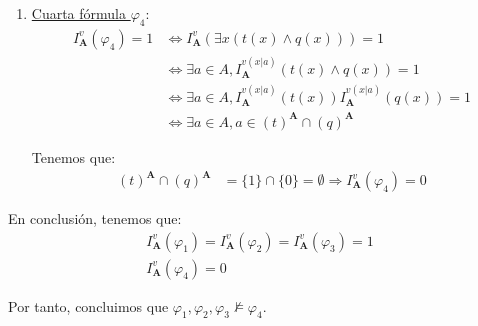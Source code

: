 \documentclass[12pt]{article}
\renewcommand{\bf}[1]{\mathbf{#1}}
\begin{document}
\begin{ejercicio}
\begin{enumerate}
        \item \ul{Cuarta fórmula $\varphi_4$}:
        \begin{align*}
            I_{\bf{A}}^v(\varphi_4) = 1 &\Longleftrightarrow
            I_{\bf{A}}^v(\exists x\left( t(x) \land q(x) \right)) = 1\\
            & \Longleftrightarrow \exists a\in A, I_{\bf{A}}^{v(x|a)}\left( t(x) \land q(x) \right) = 1\\
            & \Longleftrightarrow \exists a\in A, I_{\bf{A}}^{v(x|a)}\left( t(x) \right)I_{\bf{A}}^{v(x|a)}\left( q(x) \right) = 1\\
            & \Longleftrightarrow \exists a\in A, a\in (t)^{\bf{A}}\cap (q)^{\bf{A}}
        \end{align*}
    
        Tenemos que:
        \begin{align*}
            (t)^{\bf{A}}\cap (q)^{\bf{A}} &= \{1\}\cap \{0\} = \emptyset
            \Longrightarrow
            I_{\bf{A}}^v(\varphi_4) = 0
        \end{align*}
    \end{enumerate}
    
    En conclusión, tenemos que:   
    \begin{gather*}
        I_{\bf{A}}^v(\varphi_1) = I_{\bf{A}}^v(\varphi_2) = I_{\bf{A}}^v(\varphi_3) = 1\\
        I_{\bf{A}}^v(\varphi_4) = 0
    \end{gather*}

    Por tanto, concluimos que $\varphi_1, \varphi_2, \varphi_3 \not\models \varphi_4$.
\end{ejercicio}
\end{document}
